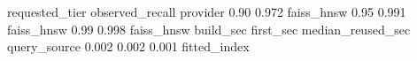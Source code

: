 \begin{CodeChunk}
\begin{CodeOutput}
 requested_tier observed_recall   provider
           0.90           0.972 faiss_hnsw
           0.95           0.991 faiss_hnsw
           0.99           0.998 faiss_hnsw
 build_sec first_sec median_reused_sec query_source
     0.002     0.002             0.001 fitted_index
\end{CodeOutput}
\end{CodeChunk}
